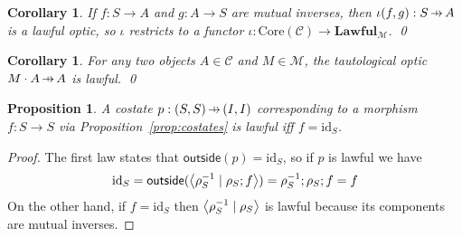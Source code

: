 \documentclass[11pt,letterpaper]{article}
\theoremstyle{plain}
\newtheorem{proposition}[theorem]{Proposition}
\newtheorem{corollary}[theorem]{Corollary}
\theoremstyle{definition}
\newtheorem{remark}[theorem]{Remark}
\newcommand{\C}{\mathscr{C}}
\newcommand{\M}{\mathscr{M}}
\newcommand{\Optic}{\mathbf{Optic}}
\newcommand{\Lawful}{\mathbf{Lawful}}
\newcommand{\id}{\mathrm{id}}
\newcommand{\act}{\cdot}
\newcommand{\rep}[2]{{\ensuremath \left\langle #1 \mid #2 \right\rangle}}
\newcommand{\outside}{\mathsf{outside}}
\newcommand{\hto}{\ensuremath{\,\mathaccent\shortmid\rightarrow\,}}
\newcommand{\todo}[1]{\textcolor{red}{\small #1}}
\begin{document}
\begin{corollary}\label{cor:iota-lawful}
  If $f : S \to A$ and $g : A \to S$ are mutual inverses, then $\iota(f, g) : S \hto A$ is a lawful optic, so $\iota$ restricts to a functor $\iota : \mathrm{Core}(\C) \to \Lawful_\M$. \qed
\end{corollary}

\begin{corollary}\label{cor:tautological-lawful}
   For any two objects $A \in \C$ and $M \in \M$, the tautological optic $M \act A \hto A$ is lawful. \qed
\end{corollary}

\begin{proposition}
A costate $p : (S, S) \hto (I, I)$ corresponding to a morphism $f : S \to S$ via Proposition~\ref{prop:costates} is lawful iff $f = \id_S$.
\end{proposition}
\begin{proof}
The first law states that $\outside(p) = \id_S$, so if $p$ is lawful we have
\[  \id_S = \outside(\rep{\rho_S^{-1}}{\rho_S;f}) =  \rho_S^{-1};\rho_S;f = f \]
On the other hand, if $f  = \id_S$ then $\rep{\rho_S^{-1}}{\rho_S}$ is lawful because its components are mutual inverses.
\end{proof}

\end{document}
